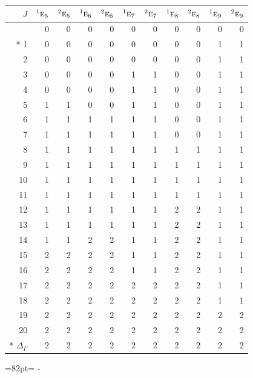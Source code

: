 \documentclass[10pt,a4paper]{article}
\makeatletter
\def\grouprule#1#2{\noalign{\marks\LTgroupmarks{\the\belowrulesep}\nobreak\vskip#1%
  \vskip\aboverulesep}\multispan\LT@cols\unskip{\leaders\hrule\@height#2\hfill\kern\z@}\cr
  \noalign{\penalty\LTrulebreak\vskip\belowrulesep\global\@lastruleclass\z@}}
\newcommand{\needspace}[1]{\par\penalty-100\begingroup\dimen0=#1\relax\dimen2=\pagegoal
  \advance\dimen2-\pagetotal\ifdim\dimen0>\dimen2\relax\ifdim\dimen2>0pt\vfil\break\fi\fi
  \endgroup}
\numberwithin{equation}{section}
\newcommand{\irr}[1]{\text{\normalfont\scshape #1}}
\newcommand{\conjpair}[1]{{}^{#1}}
\makeatother
\begin{document}
{\small\begin{longtable}{@{}rrrrrrrrrrr@{}}\toprule
$J$ & $\conjpair{1}\irr{e}_{5}$ & $\conjpair{2}\irr{e}_{5}$ & $\conjpair{1}\irr{e}_{6}$ & $\conjpair{2}\irr{e}_{6}$ & $\conjpair{1}\irr{e}_{7}$ & $\conjpair{2}\irr{e}_{7}$ & $\conjpair{1}\irr{e}_{8}$ & $\conjpair{2}\irr{e}_{8}$ & $\conjpair{1}\irr{e}_{9}$ & $\conjpair{2}\irr{e}_{9}$\\\midrule\endhead
\bottomrule\endfoot\endlastfoot
0 & 0 & 0 & 0 & 0 & 0 & 0 & 0 & 0 & 0 & 0\\*
1 & 0 & 0 & 0 & 0 & 0 & 0 & 0 & 0 & 1 & 1\\
2 & 0 & 0 & 0 & 0 & 0 & 0 & 0 & 0 & 1 & 1\\
3 & 0 & 0 & 0 & 0 & 1 & 1 & 0 & 0 & 1 & 1\\
4 & 0 & 0 & 0 & 0 & 1 & 1 & 0 & 0 & 1 & 1\\
5 & 1 & 1 & 0 & 0 & 1 & 1 & 0 & 0 & 1 & 1\\
6 & 1 & 1 & 1 & 1 & 1 & 1 & 0 & 0 & 1 & 1\\
7 & 1 & 1 & 1 & 1 & 1 & 1 & 0 & 0 & 1 & 1\\
8 & 1 & 1 & 1 & 1 & 1 & 1 & 1 & 1 & 1 & 1\\
9 & 1 & 1 & 1 & 1 & 1 & 1 & 1 & 1 & 1 & 1\\
10 & 1 & 1 & 1 & 1 & 1 & 1 & 1 & 1 & 1 & 1\\
11 & 1 & 1 & 1 & 1 & 1 & 1 & 1 & 1 & 1 & 1\\
12 & 1 & 1 & 1 & 1 & 1 & 1 & 2 & 2 & 1 & 1\\
13 & 1 & 1 & 1 & 1 & 1 & 1 & 2 & 2 & 1 & 1\\
14 & 1 & 1 & 2 & 2 & 1 & 1 & 2 & 2 & 1 & 1\\
15 & 2 & 2 & 2 & 2 & 1 & 1 & 2 & 2 & 1 & 1\\
16 & 2 & 2 & 2 & 2 & 1 & 1 & 2 & 2 & 1 & 1\\
17 & 2 & 2 & 2 & 2 & 2 & 2 & 2 & 2 & 1 & 1\\
18 & 2 & 2 & 2 & 2 & 2 & 2 & 2 & 2 & 1 & 1\\
19 & 2 & 2 & 2 & 2 & 2 & 2 & 2 & 2 & 2 & 2\\
20 & 2 & 2 & 2 & 2 & 2 & 2 & 2 & 2 & 2 & 2\\*
\grouprule{0pt}{\lightrulewidth} $\Delta_\Gamma$ & 2 & 2 & 2 & 2 & 2 & 2 & 2 & 2 & 2 & 2\\
\bottomrule\end{longtable}}
\needspace{82pt}
\end{document}
